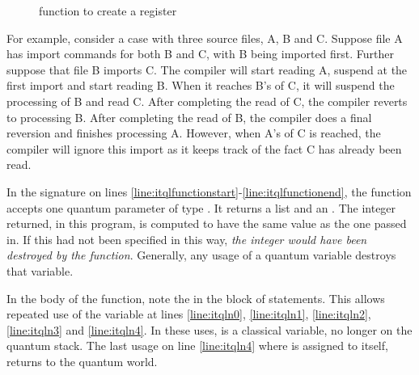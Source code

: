 \begin{figure}[htbp]
\begin{singlespace}

\end{singlespace}
\caption{\lqpl{} function to create a \qbit{} register}
\label{fig:defsec:inttoqbit}
\end{figure}

For example, consider a case with three source files, A, B and C.
Suppose file A has import commands for both B and  C, with B being
imported first. Further suppose that  file B 
 imports C. The compiler will start reading A, suspend at the first 
import and start reading B. When it reaches B's  of C, it
will suspend the processing of B and read C. 
After completing the read of C, the compiler
reverts to processing B.
After completing the read of B, the compiler does a 
final reversion and finishes  processing  A. 
However, when A's  of C
is reached, the compiler will ignore this import
 as it keeps track of the fact C has
already been read.

In the signature on lines 
\ref{line:itqlfunctionstart}-\ref{line:itqlfunctionend},  
the function accepts
one quantum parameter of type . It returns
a   list and an . The integer returned, in
this program, is computed to have 
the same value as the one passed in. If this had not been
specified in this way, 
\emph{the integer would have been destroyed by the function}.  Generally, any usage
of a quantum variable destroys that variable. 

In the body of the function, note the  in the
 block of statements. This allows  repeated 
use of the variable  at lines \ref{line:itqln0}, \ref{line:itqln1},
\ref{line:itqln2}, \ref{line:itqln3} and \ref{line:itqln4}. In these uses,
 is a classical variable, no longer on the quantum stack. The last
usage on line \ref{line:itqln4} where  is assigned to itself, 
returns  to the quantum world.



